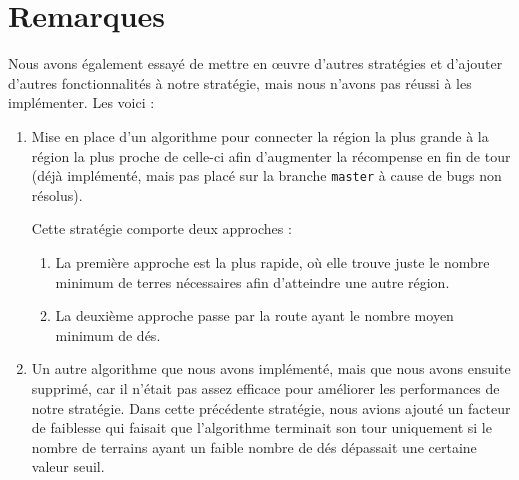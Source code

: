 \documentclass[french,nochapter,11pt]{RapportProjet}
\begin{document}
\section{Remarques}
Nous avons également essayé de mettre en \oe uvre d'autres stratégies et d'ajouter d'autres fonctionnalités à notre stratégie, mais nous n'avons pas réussi à les implémenter.
Les voici : 
\begin{enumerate}
    \item Mise en place d'un algorithme pour connecter la région la plus grande à la région la plus proche de celle-ci afin d'augmenter la récompense en fin de tour 
    (déjà implémenté, mais pas placé sur la branche \texttt{master} à cause de bugs non résolus).
    
    Cette stratégie comporte deux approches :
    \begin{enumerate}
        \item La première approche est la plus rapide, où elle trouve juste le nombre minimum de terres nécessaires afin d'atteindre une autre région.
        \item La deuxième approche passe par la route ayant le nombre moyen minimum de dés.
    \end{enumerate}

    \item Un autre algorithme que nous avons implémenté, mais que nous avons ensuite supprimé, car il n'était pas assez efficace pour améliorer les performances de notre stratégie.
    Dans cette précédente stratégie, nous avions ajouté un facteur de faiblesse qui faisait que l'algorithme terminait son tour uniquement si le nombre de terrains ayant 
    un faible nombre de dés dépassait une certaine valeur seuil.
\end{enumerate}
\end{document}
